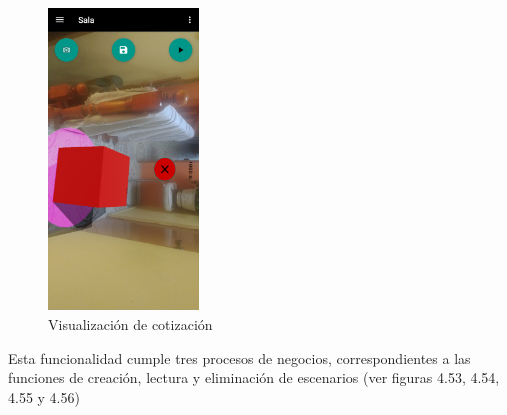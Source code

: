 \begin{figure}[h!]
	\centering
	\includegraphics[width=4cm,height=8cm]{imagenes/desarrollo/app/camera01.png}
	\caption{Visualización de cotización}
	\label{fig:coti}
\end{figure}

Esta funcionalidad cumple tres procesos de negocios, correspondientes a las funciones de creación, lectura y eliminación de escenarios (ver figuras 4.53, 4.54, 4.55 y 4.56)

